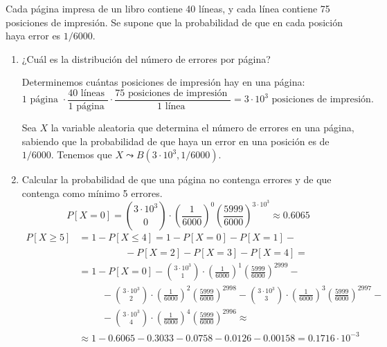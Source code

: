 \begin{ejercicio}
 Cada página impresa de un libro contiene 40 líneas, y cada línea contiene 75 posiciones de impresión. Se supone que la probabilidad de que en cada posición haya error es $1/6000$.
    \begin{enumerate}
        \item ¿Cuál es la distribución del número de errores por página?

        Determinemos cuántas posiciones de impresión hay en una página:
        \begin{equation*}
            1 \text{ página } \cdot \frac{40 \text{ líneas }}{1 \text{ página }} \cdot \frac{75 \text{ posiciones de impresión }}{1 \text{ línea }} = 3\cdot 10^3 \text{ posiciones de impresión.}
        \end{equation*}

        Sea $X$ la variable aleatoria que determina el número de errores en una página, sabiendo que la probabilidad de que haya un error en una posición es de $1/6000$. Tenemos que $X\leadsto B(3\cdot 10^3, 1/6000)$.


        \item Calcular la probabilidad de que una página no contenga errores y de que contenga como mínimo 5 errores.
        \begin{equation*}
            P[X=0]=\binom{3\cdot 10^3}{0}\cdot \left(\frac{1}{6000}\right)^0 \left(\frac{5999}{6000}\right)^{3\cdot 10^3} \approx 0.6065
        \end{equation*}
        \begin{equation*}\begin{split}
            P[X\geq 5]
            &=1-P[X\leq 4]
            =1-P[X=0]-P[X=1]-\\ &\hspace{2cm}- P[X=2]-P[X=3]-P[X=4] =\\
            &= 1-P[X=0]
            -
            \binom{3\cdot 10^3}{1}\cdot \left(\frac{1}{6000}\right)^1 \left(\frac{5999}{6000}\right)^{2999} -
            \\&\hspace{1cm} -
            \binom{3\cdot 10^3}{2}\cdot \left(\frac{1}{6000}\right)^2 \left(\frac{5999}{6000}\right)^{2998}
            -
            \binom{3\cdot 10^3}{3}\cdot \left(\frac{1}{6000}\right)^3 \left(\frac{5999}{6000}\right)^{2997} -
            \\&\hspace{1cm}
            -
            \binom{3\cdot 10^3}{4}\cdot \left(\frac{1}{6000}\right)^4 \left(\frac{5999}{6000}\right)^{2996} \approx\\
            &\approx 1-0.6065 - 0.3033-0.0758 - 0.0126-0.00158 = 0.1716\cdot 10^{-3}
        \end{split}\end{equation*}


\end{enumerate}
\end{ejercicio}
